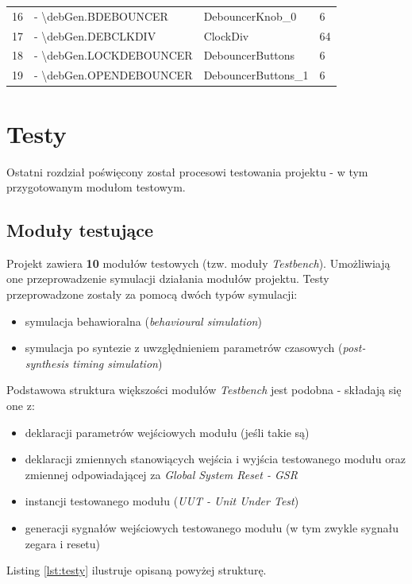 \documentclass[12pt] {article}
\begin{document}
\begin{table}[H]
\begin{tabular}{@{}llll@{}}
16        & - \textbackslash{}debGen.BDEBOUNCER    & DebouncerKnob\_0           & 6                        \\
17        & - \textbackslash{}debGen.DEBCLKDIV     & ClockDiv                   & 64                       \\
18        & - \textbackslash{}debGen.LOCKDEBOUNCER & DebouncerButtons           & 6                        \\
19        & - \textbackslash{}debGen.OPENDEBOUNCER & DebouncerButtons\_1        & 6                        \\ \bottomrule
\end{tabular}
\label{table:tabcells}
\end{table}

\newpage
\section{Testy}
Ostatni rozdział poświęcony został procesowi testowania projektu - w tym przygotowanym modułom testowym.

\subsection{Moduły testujące}
Projekt zawiera \textbf{10} modułów testowych (tzw. moduły \textit{Testbench}). Umożliwiają one przeprowadzenie symulacji działania modułów projektu. Testy przeprowadzone zostały za pomocą dwóch typów symulacji:
\begin{itemize}
\item symulacja behawioralna (\textit{behavioural simulation})
\item symulacja po syntezie z uwzględnieniem parametrów czasowych (\textit{post-synthesis timing simulation})
\end{itemize}
Podstawowa struktura większości modułów \textit{Testbench} jest podobna - składają się one z:
\begin{itemize}
\item deklaracji parametrów wejściowych modułu (jeśli takie są)
\item deklaracji zmiennych stanowiących wejścia i wyjścia testowanego modułu oraz zmiennej odpowiadającej za \textit{Global System Reset - GSR}
\item instancji testowanego modułu (\textit{UUT - Unit Under Test})
\item generacji sygnałów wejściowych testowanego modułu (w tym zwykle sygnału zegara i resetu)
\end{itemize}
Listing \ref{lst:testy} ilustruje opisaną powyżej strukturę.
\end{document}
